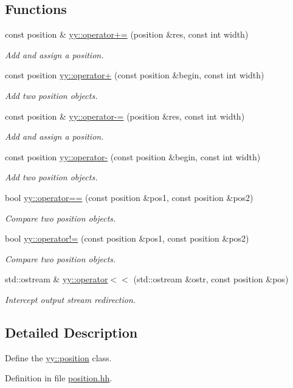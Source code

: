 \subsection*{Functions}
\begin{DoxyCompactItemize}
\item 
const position \& \hyperlink{namespaceyy_aca369d44a16c9c73bdcbbf4966ec4675}{yy::operator+=} (position \&res, const int width)
\begin{DoxyCompactList}\small\item\em Add and assign a position. \end{DoxyCompactList}\item 
const position \hyperlink{namespaceyy_a26f5ab7d06a8b08b7fb9171e90ad87d7}{yy::operator+} (const position \&begin, const int width)
\begin{DoxyCompactList}\small\item\em Add two position objects. \end{DoxyCompactList}\item 
const position \& \hyperlink{namespaceyy_a26552e3cfc333fb6b3cf933e1d54e724}{yy::operator-\/=} (position \&res, const int width)
\begin{DoxyCompactList}\small\item\em Add and assign a position. \end{DoxyCompactList}\item 
const position \hyperlink{namespaceyy_a870347901bc2465a095864610c9d04b1}{yy::operator-\/} (const position \&begin, const int width)
\begin{DoxyCompactList}\small\item\em Add two position objects. \end{DoxyCompactList}\item 
bool \hyperlink{namespaceyy_a30a61b0569cd2c9ea4ae16eb4994c7b3}{yy::operator==} (const position \&pos1, const position \&pos2)
\begin{DoxyCompactList}\small\item\em Compare two position objects. \end{DoxyCompactList}\item 
bool \hyperlink{namespaceyy_abf91f5a379cf9f8c8be94f650c48c06c}{yy::operator!=} (const position \&pos1, const position \&pos2)
\begin{DoxyCompactList}\small\item\em Compare two position objects. \end{DoxyCompactList}\item 
std::ostream \& \hyperlink{namespaceyy_a06136cdcbbc907e3bae2316361eeebb9}{yy::operator$<$$<$} (std::ostream \&ostr, const position \&pos)
\begin{DoxyCompactList}\small\item\em Intercept output stream redirection. \end{DoxyCompactList}\end{DoxyCompactItemize}


\subsection{Detailed Description}
Define the \hyperlink{classyy_1_1position}{yy::position} class. 

Definition in file \hyperlink{position_8hh_source}{position.hh}.

